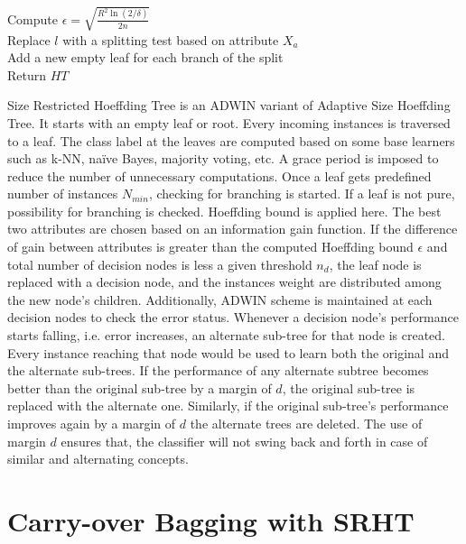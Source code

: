 \begin{algorithm}[htbp]
{{{{                    Compute $\epsilon = \sqrt{\frac{R^2 \ln(2/\delta)}{2n}}$   \\
                    
                     {
                         {
                            Replace $l$ with a splitting test based on attribute $X_a$ \\
                            Add a new empty leaf for each branch of the split \\
                        }
                    }
                }
            }
        }
    Return $HT$
    }
\end{algorithm}

Size Restricted Hoeffding Tree is an ADWIN variant of Adaptive Size Hoeffding Tree. It starts with an empty leaf or root. Every incoming instances is traversed to a leaf. The class label at the leaves are computed based on some base learners such as k-NN, na\"ive Bayes, majority voting, etc. A grace period is imposed to reduce the number of unnecessary computations. Once a leaf gets predefined number of instances $N_{min}$, checking for branching is started. If a leaf is not pure, possibility for branching is checked. Hoeffding bound is applied here. The best two attributes  are chosen based on an information gain function. If the difference of gain between attributes is greater than the computed Hoeffding bound $\epsilon$ and total number of decision nodes is less a given threshold $n_d$, the leaf node is replaced with a decision node, and the instances weight are distributed among the new node's children. Additionally, ADWIN scheme is maintained at each decision nodes to check the error status. Whenever a decision node's performance starts falling, i.e. error increases, an alternate sub-tree for that node is created. Every instance reaching that node would be used to learn both the original and the alternate sub-trees. If the performance of any alternate subtree becomes better than the original sub-tree by a margin of $d$, the original sub-tree is replaced with the alternate one. Similarly, if the original sub-tree's performance improves again by a margin of $d$ the alternate trees are deleted. The use of margin $d$ ensures that, the classifier will not swing back and forth in case of similar and alternating concepts.

\section{Carry-over Bagging with SRHT}

